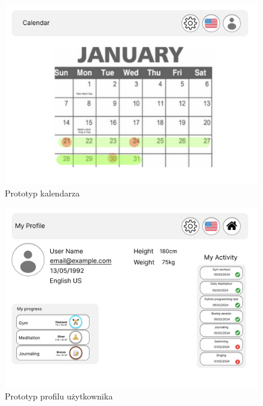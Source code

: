 \begin{figure}[H]
    \centering
    \includegraphics[width=1\textwidth]{Obrazy/prototypy/kalendarz.png}
    \caption{Prototyp kalendarza}
    \label{fig:my_label}
\end{figure}

\begin{figure}[H]
    \centering
    \includegraphics[width=1\textwidth]{Obrazy/prototypy/profil_uzytkownika.png}
    \caption{Prototyp profilu użytkownika}
    \label{fig:my_label}
\end{figure}

\clearpage